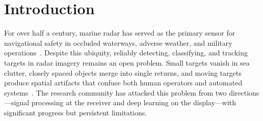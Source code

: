 \documentclass[colorlinks,upint,balance]{asmeconf}
\begin{document}
\begin{abstract}
Echo trails---the persistence of radar returns across successive PPI scans---appear on every marine radar display, yet their effect on deep learning detectors has never been studied. This paper presents a systematic ablation study of how trail length, decay function, intensity encoding, color mapping, target range, clutter level, target proximity, and trajectory crossing influence YOLOv8 detection performance on simulated X-Band marine radar imagery. Results reveal that target speed dominates detection performance far more than any trail rendering parameter, that echo trails counterintuitively \textit{degrade} detection of stationary targets by spreading compact signatures, and that optimal trail length depends strongly on target range. These findings motivate range-adaptive trail rendering as a design principle and challenge the assumption that echo trails universally benefit machine-learning-driven maritime perception.
\end{abstract}


\section{Introduction}

For over half a century, marine radar has served as the primary sensor for navigational safety in occluded waterways, adverse weather, and military operations~\cite{Skolnik2001Radar}. Despite this ubiquity, reliably detecting, classifying, and tracking targets in radar imagery remains an open problem. Small targets vanish in sea clutter, closely spaced objects merge into single returns, and moving targets produce spatial artifacts that confuse both human operators and automated systems~\cite{Ward2013Marine, Chen2022VisibilityGraph}. The research community has attacked this problem from two directions---signal processing at the receiver and deep learning on the display---with significant progress but persistent limitations.
\end{document}
